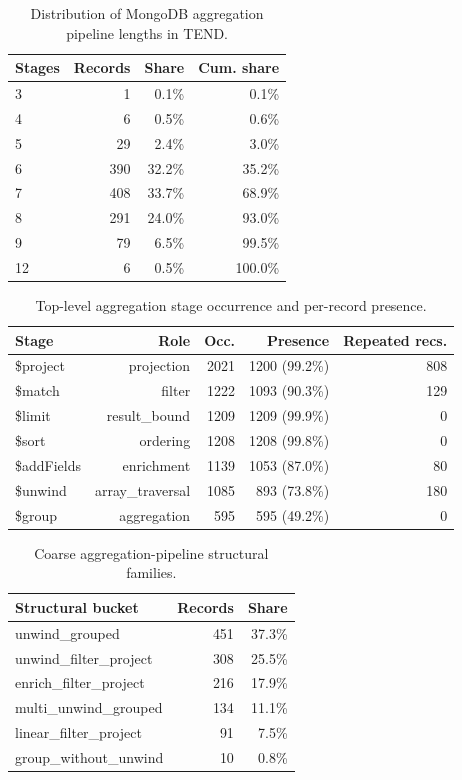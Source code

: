 \begin{table}[t]
\centering
\caption{Distribution of MongoDB aggregation pipeline lengths in TEND.}
\label{tab:tend-stage-counts}
\begin{tabular}{lrrr}
\toprule
Stages & Records & Share & Cum. share \\
\midrule
3 & 1 & 0.1\% & 0.1\% \\
4 & 6 & 0.5\% & 0.6\% \\
5 & 29 & 2.4\% & 3.0\% \\
6 & 390 & 32.2\% & 35.2\% \\
7 & 408 & 33.7\% & 68.9\% \\
8 & 291 & 24.0\% & 93.0\% \\
9 & 79 & 6.5\% & 99.5\% \\
12 & 6 & 0.5\% & 100.0\% \\
\bottomrule
\end{tabular}
\end{table}

\begin{table}[t]
\centering
\caption{Top-level aggregation stage occurrence and per-record presence.}
\label{tab:tend-stage-types}
\begin{tabular}{lrrrr}
\toprule
Stage & Role & Occ. & Presence & Repeated recs. \\
\midrule
\$project & projection & 2021 & 1200 (99.2\%) & 808 \\
\$match & filter & 1222 & 1093 (90.3\%) & 129 \\
\$limit & result\_bound & 1209 & 1209 (99.9\%) & 0 \\
\$sort & ordering & 1208 & 1208 (99.8\%) & 0 \\
\$addFields & enrichment & 1139 & 1053 (87.0\%) & 80 \\
\$unwind & array\_traversal & 1085 & 893 (73.8\%) & 180 \\
\$group & aggregation & 595 & 595 (49.2\%) & 0 \\
\bottomrule
\end{tabular}
\end{table}

\begin{table}[t]
\centering
\caption{Coarse aggregation-pipeline structural families.}
\label{tab:tend-stage-structural-buckets}
\begin{tabular}{lrr}
\toprule
Structural bucket & Records & Share \\
\midrule
unwind\_grouped & 451 & 37.3\% \\
unwind\_filter\_project & 308 & 25.5\% \\
enrich\_filter\_project & 216 & 17.9\% \\
multi\_unwind\_grouped & 134 & 11.1\% \\
linear\_filter\_project & 91 & 7.5\% \\
group\_without\_unwind & 10 & 0.8\% \\
\bottomrule
\end{tabular}
\end{table}
